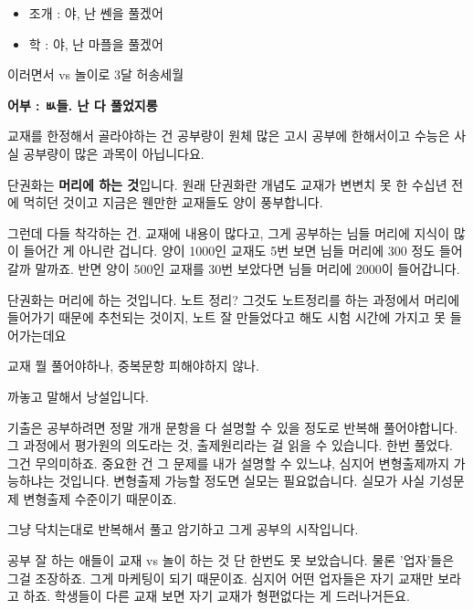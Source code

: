 \begin{itemize}
    \item[] 조개 : 야, 난 쎈을 풀겠어
    \item[] 학     : 야, 난 마플을 풀겠어
\end{itemize}
\vspace{5mm}

이러면서 vs 놀이로 3달 허송세월
\vspace{5mm}

\textbf{어부 : ㅄ들. 난 다 풀었지롱}
\vspace{5mm}

교재를 한정해서 골라야하는 건
공부량이 원체 많은 고시 공부에 한해서이고
수능은 사실 공부량이 많은 과목이 아닙니다요.
\vspace{5mm}

단권화는 \textbf{머리에 하는 것}입니다. 원래 단권화란 개념도 교재가 변변치 못 한 수십년 전에 먹히던 것이고
지금은 웬만한 교재들도 양이 풍부합니다.
\vspace{5mm}

그런데 다들 착각하는 건. 교재에 내용이 많다고, 그게 공부하는 님들 머리에 지식이 많이 들어간 게 아니란 겁니다.
양이 1000인 교재도 5번 보면 님들 머리에 300 정도 들어갈까 말까죠.
반면 양이 500인 교재를 30번 보았다면 님들 머리에 2000이 들어갑니다.
\vspace{5mm}

단권화는 머리에 하는 것입니다.
노트 정리? 그것도 노트정리를 하는 과정에서 머리에 들어가기 때문에 추천되는 것이지,
노트 잘 만들었다고 해도 시험 시간에 가지고 못 들어가는데요
\vspace{5mm}

교재 뭘 풀어야하나, 중복문항 피해야하지 않나.
\vspace{5mm}

까놓고 말해서 낭설입니다.
\vspace{5mm}

기출은 공부하려면 정말 개개 문항을 다 설명할 수 있을 정도로 반복해 풀어야합니다.
그 과정에서 평가원의 의도라는 것, 출제원리라는 걸 읽을 수 있습니다.
한번 풀었다. 그건 무의미하죠. 중요한 건 그 문제를 내가 설명할 수 있느냐, 심지어 변형출제까지 가능하냐는 것입니다.
변형출제 가능할 정도면 실모는 필요없습니다. 실모가 사실 기성문제 변형출제 수준이기 때문이죠.
\vspace{5mm}

그냥 닥치는대로 반복해서 풀고 암기하고 그게 공부의 시작입니다.
\vspace{5mm}

공부 잘 하는 애들이 교재 vs 놀이 하는 것 단 한번도 못 보았습니다.
물론 '업자'들은 그걸 조장하죠. 그게 마케팅이 되기 때문이죠.
심지어 어떤 업자들은 자기 교재만 보라고 하죠. 학생들이 다른 교재 보면 자기 교재가 형편없다는 게 드러나거든요.
\vspace{5mm}

